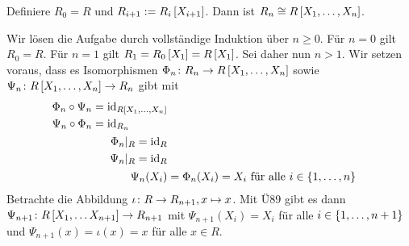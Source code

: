 \begin{exercisePage}
	\setcounter{taskcount}{109}
	
    \pagebreak
    
	\begin{exercise}
		Definiere $R_0 = R$ und $R_{i+1} := R_i \left[ X_{i+1} \right]$. Dann ist $R_n \mathrel{\cong} R \left[ X_1, \dots , X_n \right]$.
	\end{exercise}
	\begin{solution}
		Wir lösen die Aufgabe durch vollständige Induktion über $n \geq 0$. Für $n=0$ gilt $R_0 = R$. Für $n=1$ gilt $R_1 = R_0 \left[ X_1 \right] = R \left[ X_1 \right]$. Sei daher nun $n > 1$. Wir setzen voraus, dass es Isomorphismen $\Phi_n \colon R_n \to R \left[ X_1, \dots, X_n \right]$ sowie $\Psi_n \colon R \left[ X_1, \dots, X_n \right] \to R_n$ gibt mit
		\begin{subequations}
			\begin{align}
			\begin{split}
			\Phi_n \circ \Psi_n &= \operatorname{id}_{R \left[ X_1, \dots, X_n \right]} \\
			\Psi_n \circ \Phi_n &= \operatorname{id}_{R_n}
			\end{split} \label{eq: 110_komp_psi_phi}\\
			\begin{split}
				\Phi_n |_R &= \operatorname{id}_R \\
				\Psi_n |_R &= \operatorname{id}_R 
			\end{split} \label{eq: 110_einschraenkung_psi_phi}\\
			\Psi_n(X_i) &= \Phi_n(X_i) = X_i \text{ für alle } i \in \left\{ 1, \dots, n \right\} \label{eq: 110_psi_phi_gleich}
			\end{align}
		\end{subequations}
		Betrachte die Abbildung $\iota \colon R \to R_{n+1}, x \mapsto x$. Mit Ü89 gibt es dann $\Psi_{n+1} \colon R \left[ X_1, \dots X_{n+1} \right] \to R_{n+1}$ mit $\Psi_{n+1}(X_i) = X_i$ für alle $i \in \left\{ 1, \dots, n+1 \right\}$ und $\Psi_{n+1}(x)=\iota(x) = x$ für alle $x \in R$.
		

\end{solution}
\end{exercisePage}
